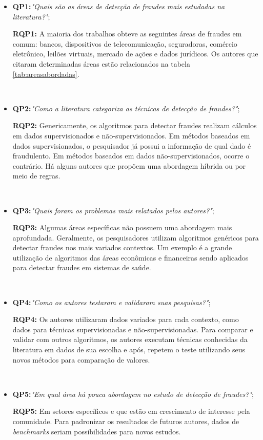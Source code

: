 \documentclass[smallextended]{svjour3}
\begin{document}
\begin{itemize}
	\item \textbf{QP1:}\textit{"Quais são as áreas de detecção de fraudes mais estudadas na literatura?"};
	
	\textbf{RQP1:} A maioria dos trabalhos obteve as seguintes áreas de fraudes em comum: bancos, dispositivos de telecomunicação, seguradoras, comércio eletrônico, leilões virtuais, mercado de ações e dados jurídicos. Os autores que citaram determinadas áreas estão relacionados na tabela \ref{tab:areasabordadas}.
	
	\
	\item \textbf{QP2:}\textit{"Como a literatura categoriza as técnicas de detecção de fraudes?"};
	
	\textbf{RQP2:} Genericamente, os algoritmos para detectar fraudes realizam cálculos em dados supervisionados e não-supervisionados. Em métodos baseados em dados supervisionados, o pesquisador já possui a informação de qual dado é fraudulento. Em métodos baseados em dados não-supervisionados, ocorre o contrário. Há alguns autores que propõem uma abordagem híbrida ou por meio de regras.
	
	\
	\item \textbf{QP3:}\textit{"Quais foram os problemas mais relatados pelos autores?"};
	
	\textbf{RQP3:} Algumas áreas específicas não possuem uma abordagem mais aprofundada. Geralmente, os pesquisadores utilizam algoritmos genéricos para detectar fraudes nos mais variados contextos. Um exemplo é a grande utilização de algoritmos das áreas econômicas e financeiras sendo aplicados para detectar fraudes em sistemas de saúde.
	
	\
	\item \textbf{QP4:}\textit{"Como os autores testaram e validaram suas pesquisas?"};
	
	\textbf{RQP4:} Os autores utilizaram dados variados para cada contexto, como dados para técnicas supervisionadas e não-supervisionadas. Para comparar e validar com outros algoritmos, os autores executam técnicas conhecidas da literatura em dados de sua escolha e após, repetem o teste utilizando seus novos métodos para comparação de valores.
	
	\
	\item \textbf{QP5:}\textit{"Em qual área há pouca abordagem no estudo de detecção de fraudes?"};
	
	\textbf{RQP5:} Em setores específicos e que estão em crescimento de interesse pela comunidade. Para padronizar os resultados de futuros autores, dados de \emph{benchmarks} seriam possibilidades para novos estudos.
	

\end{itemize}
\end{document}
